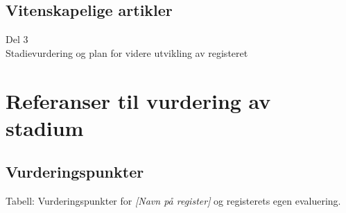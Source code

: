 \documentclass{article}
\begin{document}
    
    \subsection{Vitenskapelige artikler}
    
    
    \newpage
    
    
    
    \begin{center}
        \huge
        Del 3 \\
        \vspace{5mm}
        Stadievurdering og plan for videre utvikling av registeret
        \normalsize
    \end{center}
    \newpage
    
    
    \section{Referanser til vurdering av stadium}
    
    \subsection{Vurderingspunkter}
    
    
    \vspace{5mm}
    Tabell: Vurderingspunkter for \textit{[Navn på register]} og registerets egen evaluering. 
\end{document}
